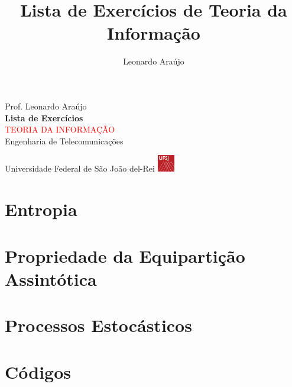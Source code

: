 \documentclass[answers]{exam}
\title{Lista de Exercícios de Teoria da Informação}
\author{Leonardo Araújo}
\newcommand*{\titleTH}{\begingroup%
\raggedleft
\vspace*{\baselineskip}
{\Large Prof. Leonardo Araújo}\\[0.167\textheight]
{\bfseries Lista de Exercícios}\\[\baselineskip]
{\textcolor{Red}{\Huge TEORIA DA INFORMAÇÃO}}\\[\baselineskip]
{\small Engenharia de Telecomunicações}\par
\vfill
{\Large Universidade Federal de São João del-Rei \includegraphics[width=2em]{../images/logoufsj.pdf}}\par
\vspace*{3\baselineskip}
\newpage
\endgroup}
\begin{document}
\titleTH
\tableofcontents

\section{Entropia}






























\section{Propriedade da Equipartição Assintótica}










\section{Processos Estocásticos}













\section{Códigos}









\end{document}
